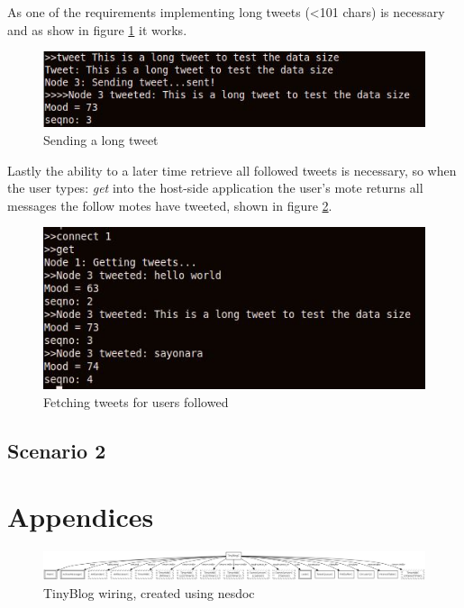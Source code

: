 \documentclass{article}
\begin{document}
\newpage
As one of the requirements implementing long tweets (\textless101 chars) is necessary and as show in figure \ref{fig:long} it works.
\begin{figure}[htb!]
\centering
\includegraphics[scale=.50]{img/long.jpg}
\caption{Sending a long tweet}
\label{fig:long}
\end{figure}


Lastly the ability to a later time retrieve all followed tweets is necessary, so when the user types: \textit{get} into the host-side application the user's mote returns all messages the follow motes have tweeted, shown in figure \ref{fig:get}.
\begin{figure}[htb!]
\centering
\includegraphics[scale=.6]{img/get.jpg}
\caption{Fetching tweets for users followed}
\label{fig:get}
\end{figure}


\subsection{Scenario 2}


\newpage
\section{Appendices}
\begin{figure}[htb!]
\centering
\includegraphics[scale=.27,angle=90]{TinyBlogAppC.png}
\caption{TinyBlog wiring, created using nesdoc}
\label{fig:fullWiring}
\end{figure}
\end{document}
